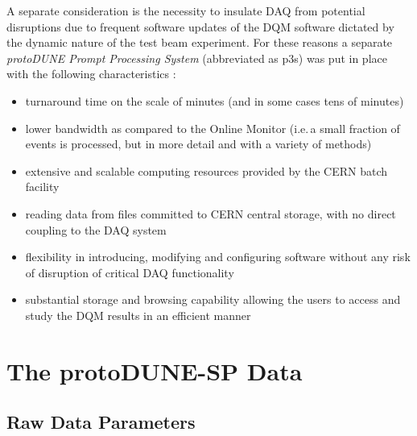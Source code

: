 \documentclass{webofc}
\newcommand{\pd}{protoDUNE\xspace}
\begin{document}
A separate consideration is the necessity to insulate DAQ from
potential disruptions due to frequent software updates of the DQM software dictated by
the dynamic nature of the test beam experiment. 
For these reasons a separate \textit{\pd Prompt Processing System} (abbreviated as p3s) was put
in place  with the following characteristics \cite{eps}:
\begin{itemize} 

\item turnaround time on the scale of minutes (and in some cases tens of minutes)

\item lower bandwidth as compared to the Online Monitor (i.e.\,a small fraction of events is processed,
but in more detail and with a variety of methods)

\item extensive and scalable computing resources provided by the CERN batch facility

\item reading data from files committed to CERN central storage, with no direct coupling to the DAQ system

\item flexibility in introducing, modifying and configuring software without any risk of disruption of
critical DAQ functionality

\item substantial storage and browsing capability allowing the users to access and study
the DQM results in an efficient manner

\end{itemize}


\section{The protoDUNE-SP Data}
\subsection{Raw Data Parameters}
\label{sec:np04_data_rate}
\end{document}
